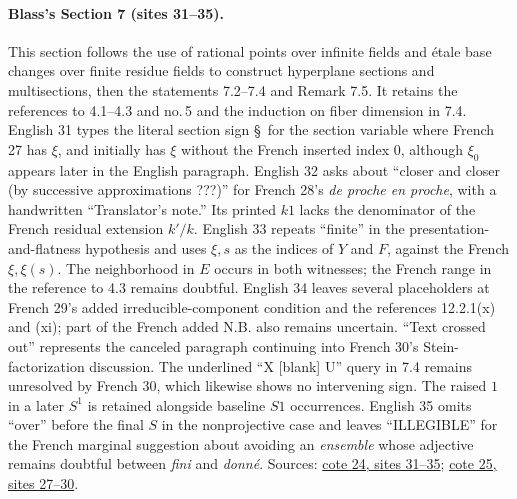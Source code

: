\documentclass[10pt,a4paper]{article}
\begin{document}
\paragraph{Blass's Section 7 (sites 31--35).}
This section follows the use of rational points over infinite fields and étale base changes over finite residue fields to construct hyperplane sections and multisections, then the statements 7.2--7.4 and Remark 7.5. It retains the references to 4.1--4.3 and no.\,5 and the induction on fiber dimension in 7.4. English 31 types the literal section sign \S\ for the section variable where French 27 has $\xi$, and initially has $\xi$ without the French inserted index $0$, although $\xi_0$ appears later in the English paragraph. English 32 asks about ``closer and closer (by successive approximations ???)'' for French 28's \emph{de proche en proche}, with a handwritten ``Translator's note.'' Its printed $k1$ lacks the denominator of the French residual extension $k'/k$. English 33 repeats ``finite'' in the presentation-and-flatness hypothesis and uses $\xi,s$ as the indices of $Y$ and $F$, against the French $\xi,\xi(s)$. The neighborhood in $E$ occurs in both witnesses; the French range in the reference to 4.3 remains doubtful. English 34 leaves several placeholders at French 29's added irreducible-component condition and the references 12.2.1(x) and (xi); part of the French added N.B. also remains uncertain. ``Text crossed out'' represents the canceled paragraph continuing into French 30's Stein-factorization discussion. The underlined ``X [blank] U'' query in 7.4 remains unresolved by French 30, which likewise shows no intervening sign. The raised $1$ in a later $S^1$ is retained alongside baseline $S1$ occurrences. English 35 omits ``over'' before the final $S$ in the nonprojective case and leaves ``ILLEGIBLE'' for the French marginal suggestion about avoiding an \emph{ensemble} whose adjective remains doubtful between \emph{fini} and \emph{donné}. Sources: \href{https://grothendieck.umontpellier.fr/web/viewer.html?file=../24.pdf\#page=32}{cote 24, sites 31--35}; \href{https://grothendieck.umontpellier.fr/web/viewer.html?file=../25.pdf\#page=28}{cote 25, sites 27--30}.
\end{document}
